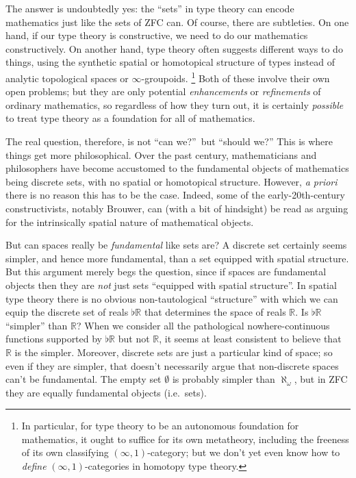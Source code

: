 \documentclass[10pt]{article}
\def\oo{\ensuremath{\infty}}
\def\io{\ensuremath{(\oo,1)}}
\def\R{\mathbb{R}}
\numberwithin{equation}{section}
\begin{document}
The answer is undoubtedly yes: the ``sets'' in type theory can encode mathematics just like the sets of ZFC can.
Of course, there are subtleties.
On one hand, if our type theory is constructive, %
we need to do our mathematics constructively. %
On another hand, type theory often suggests different ways to do things, using the synthetic spatial or homotopical structure of types instead of analytic topological spaces or $\oo$-groupoids.%
\footnote{In particular, for type theory to be an autonomous foundation for mathematics, it ought to suffice for its own metatheory, including the freeness of its own classifying $\io$-category;
but we don't yet even know how to \emph{define} $\io$-categories in homotopy type theory.}
Both of these involve their own open problems; but they are only potential \emph{enhancements} or \emph{refinements} of ordinary mathematics, so regardless of how they turn out, it is certainly \emph{possible} to treat type theory as a foundation for all of mathematics.

The real question, therefore, is not ``can we?''\ but ``should we?''
This is where things get more philosophical.
Over the past century, mathematicians and philosophers have become accustomed to the fundamental objects of mathematics being discrete sets, with no spatial or homotopical structure.
However, \textit{a priori} there is no reason this has to be the case.
Indeed, some of the early-20th-century constructivists, notably Brouwer, can (with a bit of hindsight) be read as arguing for the intrinsically spatial nature of mathematical objects.

But can spaces really be \emph{fundamental} like sets are?
A discrete set certainly seems simpler, and hence more fundamental, than a set equipped with spatial structure.
But this argument merely begs the question, since if spaces are fundamental objects then they are \emph{not} just sets ``equipped with spatial structure''.
In spatial type theory there is no obvious non-tautological ``structure'' with which we can equip the discrete set of reals $\flat\R$ that determines the space of reals $\R$.
Is $\flat\R$ ``simpler'' than $\R$?
When we consider all the pathological nowhere-continuous functions supported by $\flat\R$ but not $\R$, it seems at least consistent to believe that $\R$ is the simpler.
Moreover, discrete sets are just a particular kind of space; so even if they are simpler, that doesn't necessarily argue that non-discrete spaces can't be fundamental.
The empty set $\emptyset$ is probably simpler than $\aleph_\omega$, but in ZFC they are equally fundamental objects (i.e.\ sets).
\end{document}
